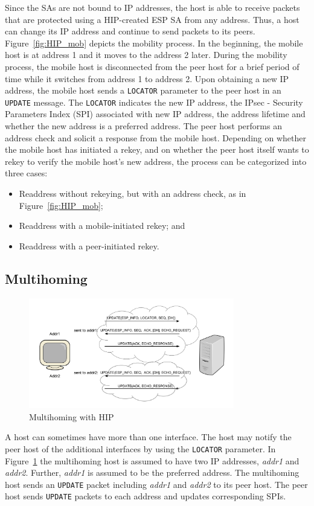 Since the SAs are not bound to IP addresses, the host is able to receive packets that are protected using a HIP-created ESP SA from any address. Thus, a host can change its IP address and continue to send packets to its peers. Figure~\ref{fig:HIP_mob} depicts the mobility process. In the beginning, the mobile host is at address 1 and it moves to the address 2 later. During the mobility process, the mobile host is disconnected from the peer host for a brief period of time while it switches from address 1 to address 2. Upon obtaining a new IP address, the mobile host sends a \texttt{LOCATOR} parameter to the peer host in an \texttt{UPDATE} message. The \texttt{LOCATOR} indicates the new IP address, the IPsec - Security Parameters Index (SPI) associated with new IP address, the address lifetime and whether the new address is a preferred address. The peer host performs an address check and solicit a response from the mobile host. Depending on whether the mobile host has initiated a rekey, and on whether the peer host itself wants to rekey to verify the mobile host's new address, the process can be categorized into three cases: 
\begin{itemize}
\item Readdress without rekeying, but with an address check, as in Figure~\ref{fig:HIP_mob}; 
\item Readdress with a mobile-initiated rekey; and 
\item Readdress with a peer-initiated rekey.
\end{itemize}

\subsection{Multihoming}
\begin{figure}[htb!]
\centering
\includegraphics[width=0.8\textwidth]{images/HIP_figure5}
\caption{Multihoming with HIP}
\label{fig:HIP_mhom}
\end{figure}
A host can sometimes have more than one interface. The host may notify the peer host of the additional interfaces by using the \texttt{LOCATOR} parameter. In Figure~\ref{fig:HIP_mhom} the multihoming host is assumed to have two IP addresses, \textit{addr1} and \textit{addr2}. Further, \textit{addr1} is assumed to be the preferred address. The multihoming host sends an \texttt{UPDATE} packet including \textit{addr1} and \textit{addr2} to its peer host. The peer host sends \texttt{UPDATE} packets to each address and updates corresponding SPIs.